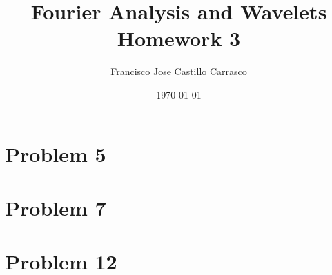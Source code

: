 




\title{Fourier Analysis and Wavelets\\Homework 3}
\author{Francisco Jose Castillo Carrasco}
\date{\today}
\maketitle




\section*{Problem 5}


\section*{Problem 7}


\section*{Problem 12}



